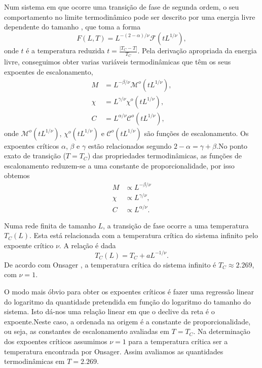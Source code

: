 \documentclass[12pt, a4paper]{article}
\begin{document}
	Num sistema em que ocorre uma transição de fase de segunda ordem, o seu comportamento no limite termodinâmico pode ser descrito por uma energia livre dependente do tamanho \cite{mc_book}, que toma a forma
	\begin{equation}
		F(L, T) = L^{-(2-\alpha)/\nu}\mathcal{F}(t L^{1/\nu}),
	\end{equation}	 
	onde $t$ é a temperatura reduzida $t = \frac{|T_C - T|}{T_C} $. Pela derivação apropriada da energia livre, conseguimos obter varias variáveis termodinâmicas que têm os seus expoentes de escalonamento,
	\begin{align}
		M &= L^{-\beta /\nu} \mathcal{M}^o (t L^{1/\nu}), \\
		\chi &= L^{\gamma /\nu} \mathcal{\chi}^o (t L^{1/\nu}), \\
		C &= L^{\alpha /\nu} \mathcal{C}^o (t L^{1/\nu}),
	\end{align}
	onde $ \mathcal{M}^o (t L^{1/\nu})$, $\mathcal{\chi}^o (t L^{1/\nu})$ e $\mathcal{C}^o (t L^{1/\nu})$ são funções de escalonamento. Os expoentes críticos $\alpha$, $\beta$ e $\gamma$ estão relacionados segundo $2-\alpha=\gamma + \beta$.No ponto exato de transição ($T=T_C$) das propriedades termodinâmicas, as funções de escalonamento reduzem-se a uma constante de proporcionalidade, por isso obtemos
	\begin{align}
		M &\propto L^{-\beta /\nu} \\
		\chi &\propto L^{\gamma /\nu} , \\
		C &\propto L^{\alpha /\nu}.
	\end{align}	
	
	Numa rede finita de tamanho $L$, a transição de fase ocorre a uma temperatura $T_C(L)$. Esta está relacionada com a temperatura crítica do sistema infinito pelo expoente crítico $\nu$. A relação é dada
	\begin{equation}\label{T_C_inf}
		T_C(L) = T_C  + a L^{-1/\nu}.
	\end{equation}
	De acordo com Onsager \cite{onsager}, a temperatura crítica do sistema infinito é $T_C \approx 2.269$, com $\nu=1$. 
		
	O modo mais óbvio para obter os expoentes críticos é fazer uma regressão linear do logaritmo da quantidade pretendida em função do logaritmo do tamanho do sistema. Isto dá-nos uma relação linear em que o declive da reta é o expoente.Neste caso, a ordenada na origem é a constante de proporcionalidade, ou seja, as constantes de escalonamento avaliadas em $T=T_C$. Na determinação dos expoentes críticos assumimos $\nu=1$ para a temperatura crítica ser a temperatura encontrada por Onsager. Assim avaliamos as quantidades termodinâmicas em $T=2.269$.
	
\end{document}
